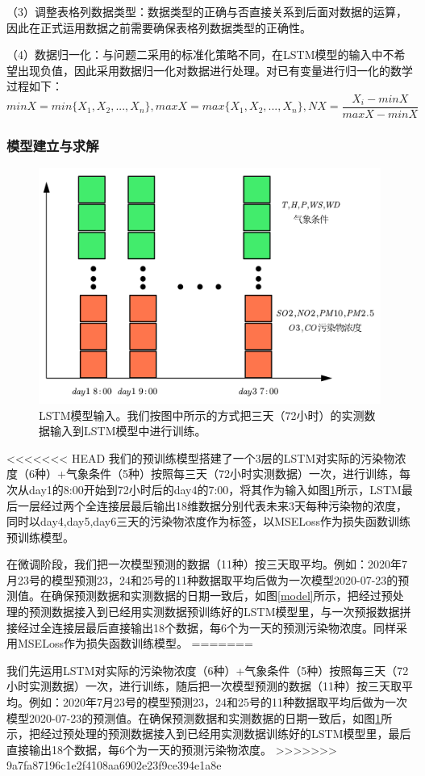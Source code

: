 \documentclass[bwprint]{gmcmthesis}
\numberwithin{figure}{section}
\begin{document}
（3）调整表格列数据类型：数据类型的正确与否直接关系到后面对数据的运算，因此在正式运用数据之前需要确保表格列数据类型的正确性。

（4）数据归一化：与问题二采用的标准化策略不同，在LSTM模型的输入中不希望出现负值，因此采用数据归一化对数据进行处理。对已有变量进行归一化的数学过程如下：
\begin{equation}
	minX = min\{X_1,X_2,...,X_n\},maxX = max\{X_1,X_2,...,X_n\},NX = \frac{X_i-minX}{maxX-minX}
\end{equation}

\subsubsection{模型建立与求解}
\begin{figure}[!h]
	\centering
	\includegraphics[width=.7\textwidth]{LSTM_input.png}
	\caption{LSTM模型输入。我们按图中所示的方式把三天（72小时）的实测数据输入到LSTM模型中进行训练。}
	\label{LSTM-INPUT}
\end{figure}
<<<<<<< HEAD
我们的预训练模型搭建了一个3层的LSTM对实际的污染物浓度（6种）+气象条件（5种）按照每三天（72小时实测数据）一次，进行训练，每次从day1的8:00开始到72小时后的day4的7:00，将其作为输入如图\ref{LSTM-INPUT}所示，LSTM最后一层经过两个全连接层最后输出18维数据分别代表未来3天每种污染物的浓度，同时以day4,day5,day6三天的污染物浓度作为标签，以MSELoss作为损失函数训练预训练模型。

在微调阶段，我们把一次模型预测的数据（11种）按三天取平均。例如：2020年7月23号的模型预测23，24和25号的11种数据取平均后做为一次模型2020-07-23的预测值。在确保预测数据和实测数据的日期一致后，如图\ref{model}所示，把经过预处理的预测数据接入到已经用实测数据预训练好的LSTM模型里，与一次预报数据拼接经过全连接层最后直接输出18个数据，每6个为一天的预测污染物浓度。同样采用MSELoss作为损失函数训练模型。
=======

我们先运用LSTM对实际的污染物浓度（6种）+气象条件（5种）按照每三天（72小时实测数据）一次，进行训练，随后把一次模型预测的数据（11种）按三天取平均。例如：2020年7月23号的模型预测23，24和25号的11种数据取平均后做为一次模型2020-07-23的预测值。在确保预测数据和实测数据的日期一致后，如图\ref{LSTM-INPUT}所示，把经过预处理的预测数据接入到已经用实测数据训练好的LSTM模型里，最后直接输出18个数据，每6个为一天的预测污染物浓度。
>>>>>>> 9a7fa87196c1e2f4108aa6902e23f9ce394e1a8e
\end{document}
